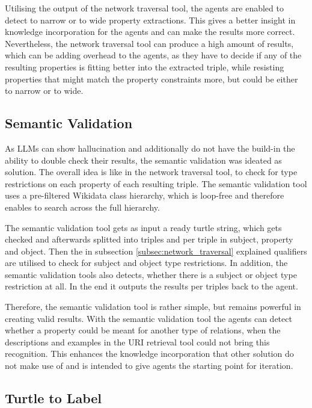 \documentclass[a4paper,oneside,bibliography=totoc]{scrbook}
\begin{document}
Utilising the output of the network traversal tool, the agents are enabled to detect to narrow or to wide property extractions. This gives a better insight in knowledge incorporation for the agents and can make the results more correct. Nevertheless, the network traversal tool can produce a high amount of results, which can be adding overhead to the agents, as they have to decide if any of the resulting properties is fitting better into the extracted triple, while resisting properties that might match the property constraints more, but could be either to narrow or to wide.

\subsection{Semantic Validation}
\label{subsec:semantic_validation}

As \acp{LLM} can show hallucination and additionally do not have the build-in the ability to double check their results, the semantic validation was ideated as solution. The overall idea is like in the network traversal tool, to check for type restrictions on each property of each resulting triple. The semantic validation tool uses a pre-filtered Wikidata class hierarchy, which is loop-free and therefore enables to search across the full hierarchy.

The semantic validation tool gets as input a ready turtle string, which gets checked and afterwards splitted into triples and per triple in subject, property and object. Then the in subsection \ref{subsec:network_traversal} explained qualifiers are utilised to check for subject and object type restrictions. In addition, the semantic validation tools also detects, whether there is a subject or object type restriction at all. In the end it outputs the results per triples back to the agent.

Therefore, the semantic validation tool is rather simple, but remains powerful in creating valid results. With the semantic validation tool the agents can detect whether a property could be meant for another type of relations, when the descriptions and examples in the URI retrieval tool could not bring this recognition. This enhances the knowledge incorporation that other solution do not make use of and is intended to give agents the starting point for iteration.

\subsection{Turtle to Label}
\label{subsec:turtle_to_label}
\end{document}
